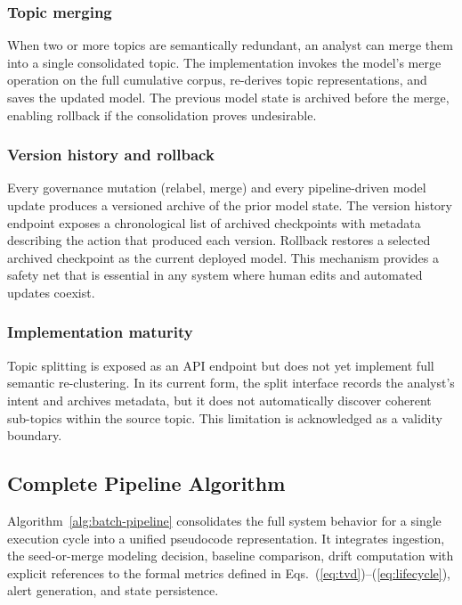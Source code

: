 \documentclass[conference]{IEEEtran}
\begin{document}
\subsubsection{Topic merging}
When two or more topics are semantically redundant, an analyst can merge them into a single consolidated topic. The implementation invokes the model's merge operation on the full cumulative corpus, re-derives topic representations, and saves the updated model. The previous model state is archived before the merge, enabling rollback if the consolidation proves undesirable.

\subsubsection{Version history and rollback}
Every governance mutation (relabel, merge) and every pipeline-driven model update produces a versioned archive of the prior model state. The version history endpoint exposes a chronological list of archived checkpoints with metadata describing the action that produced each version. Rollback restores a selected archived checkpoint as the current deployed model. This mechanism provides a safety net that is essential in any system where human edits and automated updates coexist.

\subsubsection{Implementation maturity}
Topic splitting is exposed as an API endpoint but does not yet implement full semantic re-clustering. In its current form, the split interface records the analyst's intent and archives metadata, but it does not automatically discover coherent sub-topics within the source topic. This limitation is acknowledged as a validity boundary.

\subsection{Complete Pipeline Algorithm}
Algorithm~\ref{alg:batch-pipeline} consolidates the full system behavior for a single execution cycle into a unified pseudocode representation. It integrates ingestion, the seed-or-merge modeling decision, baseline comparison, drift computation with explicit references to the formal metrics defined in Eqs.~(\ref{eq:tvd})--(\ref{eq:lifecycle}), alert generation, and state persistence.
\end{document}

